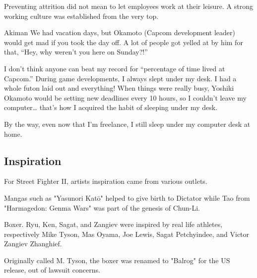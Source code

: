 

Preventing attrition did not mean to let employees work at their leisure. A strong working culture was established from the very top.

\begin{q}{Akiman\cite{akiman2003}}
  We had vacation days, but Okamoto (Capcom development leader) would get mad if you took the day off. A lot of people got yelled at by him for that, “Hey, why weren’t you here on Sunday?!”

  I don’t think anyone can beat my record for “percentage of time lived at Capcom.” During game developments, I always slept under my desk. I had a whole futon laid out and everything! When things were really busy, Yoshiki Okamoto  would be setting new deadlines every 10 hours, so I couldn’t leave my computer… that’s how I acquired the habit of sleeping under my desk. 

  By the way, even now that I’m freelance, I still sleep under my computer desk at home.
  \end{q}











\subsection{Inspiration}
For Street Fighter II, artists inspiration came from various outlets. 

Mangas such as "Yasunori Katō" helped to give birth to Dictator while Tao from "Harmagedon: Genma Wars" was part of the genesis of Chun-Li. 

Boxer. Ryu, Ken, Sagat, and Zangiev were inspired by real life athletes, respectively Mike Tyson, Mas Oyama, Joe Lewis, Sagat Petchyindee, and Victor Zangiev Zhanghief.

\begin{trivia}
Originally called M. Tyson, the boxer was renamed to "Balrog" for the US release, out of lawsuit concerns. 
\end{trivia}

